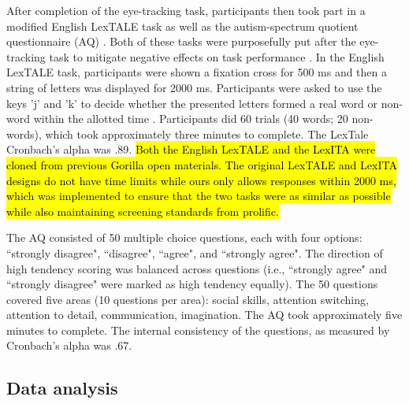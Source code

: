 After completion of the eye-tracking task, participants then took part in a modified English LexTALE \citep{lemhofer2012introducing} task as well as the autism-spectrum quotient questionnaire (AQ) \citep{Baron-Cohen2001}. Both of these tasks were purposefully put after the eye-tracking task to mitigate negative effects on task performance \citep{Chang_2024}. In the English LexTALE task, participants were shown a fixation cross for 500 ms and then a string of letters was displayed for 2000 ms. Participants were asked to use the keys 'j' and 'k' to decide whether the presented letters formed a real word or non-word within the allotted time \cite{lemhofer2012introducing}. Participants did 60 trials (40 words; 20 non-words), which took approximately three minutes to complete. The LexTale Cronbach’s alpha was .89. \hl{Both the English LexTALE and the LexITA were cloned from previous Gorilla open materials. The original LexTALE and LexITA designs do not have time limits while ours only allows responses within 2000 ms, which was implemented to ensure that the two tasks were as similar as possible while also maintaining screening standards from prolific. }

The AQ \citep{Baron-Cohen2001} consisted of 50 multiple choice questions, each with four options: ``strongly disagree", ``disagree", ``agree", and ``strongly agree". The direction of high tendency scoring was balanced across questions (i.e., ``strongly agree" and ``strongly disagree" were marked as high tendency equally). The 50 questions covered five areas (10 questions per area): social skills, attention switching, attention to detail, communication, imagination. The AQ took approximately five minutes to complete. The internal consistency of the questions, as measured by Cronbach’s alpha was .67.


\subsection{Data analysis}

